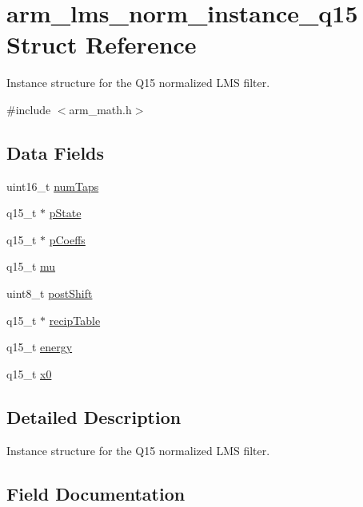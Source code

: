 \hypertarget{structarm__lms__norm__instance__q15}{}\section{arm\+\_\+lms\+\_\+norm\+\_\+instance\+\_\+q15 Struct Reference}
\label{structarm__lms__norm__instance__q15}


Instance structure for the Q15 normalized L\+MS filter.  




{\ttfamily \#include $<$arm\+\_\+math.\+h$>$}

\subsection*{Data Fields}
\begin{DoxyCompactItemize}
\item 
uint16\+\_\+t \hyperlink{structarm__lms__norm__instance__q15_a751941891e47f522a7f5375fe8990aac}{num\+Taps}
\item 
q15\+\_\+t $\ast$ \hyperlink{structarm__lms__norm__instance__q15_ae29dfdb736374fcddaeaec4b7770170c}{p\+State}
\item 
q15\+\_\+t $\ast$ \hyperlink{structarm__lms__norm__instance__q15_a7ca181a37f714d174445f486bebce26f}{p\+Coeffs}
\item 
q15\+\_\+t \hyperlink{structarm__lms__norm__instance__q15_aab4745770bd667de040227eec1b5ff8d}{mu}
\item 
uint8\+\_\+t \hyperlink{structarm__lms__norm__instance__q15_a74050e9f36542bd56f4052381a82ae8f}{post\+Shift}
\item 
q15\+\_\+t $\ast$ \hyperlink{structarm__lms__norm__instance__q15_a39b65b32f68643831304cece01e093bd}{recip\+Table}
\item 
q15\+\_\+t \hyperlink{structarm__lms__norm__instance__q15_ae7a8ccabc82348f6742ca7a2b3da2a41}{energy}
\item 
q15\+\_\+t \hyperlink{structarm__lms__norm__instance__q15_a3c975fed200b19723a2ed11efccca6cd}{x0}
\end{DoxyCompactItemize}


\subsection{Detailed Description}
Instance structure for the Q15 normalized L\+MS filter. 

\subsection{Field Documentation}
\mbox{\label{structarm__lms__norm__instance__q15_ae7a8ccabc82348f6742ca7a2b3da2a41}} 
